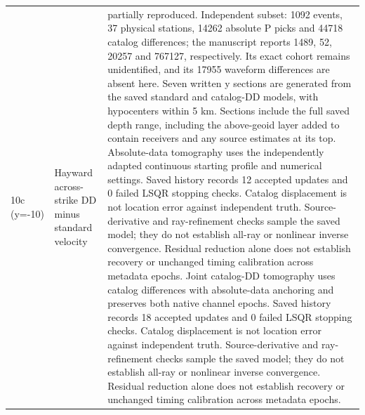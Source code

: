 \begin{longtable}{>{\raggedright\arraybackslash}p{}>{\raggedright\arraybackslash}p{}>{\raggedright\arraybackslash}p{}}
10c (y=-10) & Hayward across-strike DD minus standard velocity & partially reproduced. Independent subset: 1092 events, 37 physical stations, 14262 absolute P picks and 44718 catalog differences; the manuscript reports 1489, 52, 20257 and 767127, respectively. Its exact cohort remains unidentified, and its 17955 waveform differences are absent here. Seven written y sections are generated from the saved standard and catalog-DD models, with hypocenters within 5 km. Sections include the full saved depth range, including the above-geoid layer added to contain receivers and any source estimates at its top. Absolute-data tomography uses the independently adapted continuous starting profile and numerical settings. Saved history records 12 accepted updates and 0 failed LSQR stopping checks. Catalog displacement is not location error against independent truth. Source-derivative and ray-refinement checks sample the saved model; they do not establish all-ray or nonlinear inverse convergence. Residual reduction alone does not establish recovery or unchanged timing calibration across metadata epochs. Joint catalog-DD tomography uses catalog differences with absolute-data anchoring and preserves both native channel epochs. Saved history records 18 accepted updates and 0 failed LSQR stopping checks. Catalog displacement is not location error against independent truth. Source-derivative and ray-refinement checks sample the saved model; they do not establish all-ray or nonlinear inverse convergence. Residual reduction alone does not establish recovery or unchanged timing calibration across metadata epochs.\\

\end{longtable}
